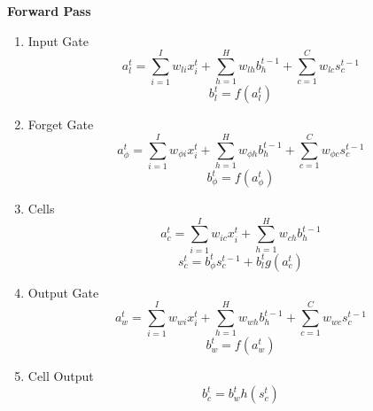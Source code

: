  {\bf Forward Pass}
 \begin{enumerate}
 \item Input Gate\\
  $$a_l^t = \sum_{i=1}^I w_{li}x_i^t + \sum_{h=1}^H w_{lh}b_h^{t-1}
		 + \sum_{c=1}^C w_{lc} s_c^{t-1}$$
  $$b_l^t = f(a_l^t)$$
 \item Forget Gate\\
  $$a_\phi^t = \sum_{i=1}^I w_{\phi i}x_i^t + \sum_{h=1}^H w_{\phi h}b_h^{t-1}
		 + \sum_{c=1}^C w_{\phi c} s_c^{t-1}$$
  $$b_\phi^t = f(a_\phi^t)$$
 \item Cells\\
  $$a_c^t = \sum_{i=1}^I w_{ic}x_i^t + \sum_{h=1}^H w_{ch}b_h^{t-1}$$
  $$s_c^t = b_\phi^t s_c^{t-1} + b_l^t g(a_c^t)$$
 \item Output Gate\\
  $$a_w^t = \sum_{i=1}^I w_{wi}x_i^t + \sum_{h=1}^H w_{wh}b_h^{t-1}
		 + \sum_{c=1}^C w_{wc} s_c^{t-1}$$
  $$b_w^t = f(a_w^t)$$
 \item Cell Output\\
  $$b_c^t = b_w^t h(s_c^t)$$
 \end{enumerate}

